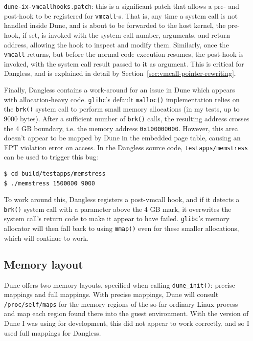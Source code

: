 \texttt{dune-ix-vmcallhooks.patch}: this is a significant patch that allows a pre- and post-hook to be registered for \lstinline!vmcall!-s. That is, any time a system call is not handled inside Dune, and is about to be forwarded to the host kernel, the pre-hook, if set, is invoked with the system call number, arguments, and return address, allowing the hook to inspect and modify them. Similarly, once the \lstinline!vmcall! returns, but before the normal code execution resumes, the post-hook is invoked, with the system call result passed to it as argument. This is critical for Dangless, and is explained in detail by Section~\ref{sec:vmcall-pointer-rewriting}.

Finally, Dangless contains a work-around for an issue in Dune which appears with allocation-heavy code. \texttt{glibc}'s default \lstinline!malloc()! implementation relies on the \lstinline!brk()! system call to perform small memory allocations (in my tests, up to 9000 bytes). After a sufficient number of \lstinline!brk()! calls, the resulting address crosses the 4 GB boundary, i.e. the memory address \texttt{0x100000000}. However, this area doesn't appear to be mapped by Dune in the embedded page table, causing an EPT violation error on access. In the Dangless source code, \texttt{testapps/memstress} can be used to trigger this bug:

\begin{verbatim}
$ cd build/testapps/memstress
$ ./memstress 1500000 9000
\end{verbatim}

To work around this, Dangless registers a post-vmcall hook, and if it detects a \lstinline!brk()! system call with a parameter above the 4 GB mark, it overwrites the system call's return code to make it appear to have failed. \texttt{glibc}'s memory allocator will then fall back to using \lstinline!mmap()! even for these smaller allocations, which will continue to work.

\subsection{Memory layout}

Dune offers two memory layouts, specified when calling \lstinline!dune_init()!: precise mappings and full mappings.
With precise mappings, Dune will consult \texttt{/proc/self/maps} for the memory regions of the so-far ordinary Linux process and map each region found there into the guest environment. With the version of Dune I was using for development, this did not appear to work correctly, and so I used full mappings for Dangless.

